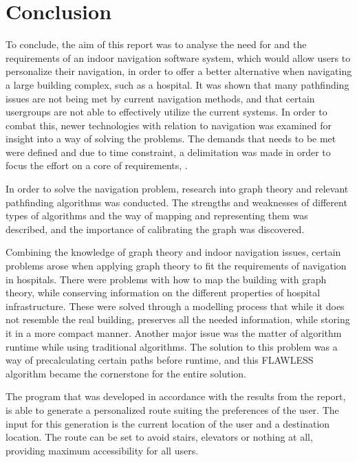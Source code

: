 \chapter{Conclusion}

To conclude, the aim of this report was to analyse the need for and the requirements of an indoor navigation software system, which would allow users to personalize their navigation, in order to offer a better alternative when navigating a large building complex, such as a hospital. It was shown that many pathfinding issues are not being met by current navigation methods, and that certain usergroups are not able to effectively utilize the current systems. In order to combat this, newer technologies with relation to navigation was examined for insight into a way of solving the problems. The demands that needs to be met were defined and due to time constraint, a delimitation was made in order to focus the effort on a core of requirements, .

In order to solve the navigation problem, research into graph theory and relevant pathfinding algorithms was conducted. The strengths and weaknesses of different types of algorithms and the way of mapping and representing them was described, and the importance of calibrating the graph was discovered. 

Combining the knowledge of graph theory and indoor navigation issues, certain problems arose when applying graph theory to fit the requirements of navigation in hospitals. There were problems with how to map the building with graph theory, while conserving information on the different properties of hospital infrastructure. These were solved through a modelling process that while it does not resemble the real building, preserves all the needed information, while storing it in a more compact manner. Another major issue was the matter of algorithm runtime while using traditional algorithms. The solution to this problem was a way of precalculating certain paths before runtime, and this FLAWLESS algorithm became the cornerstone for the entire solution.

The program that was developed in accordance with the results from the report, is able to generate a personalized route suiting the preferences of the user. The input for this generation is the current location of the user and a destination location. The route can be set to avoid stairs, elevators or nothing at all, providing maximum accessibility for all users.